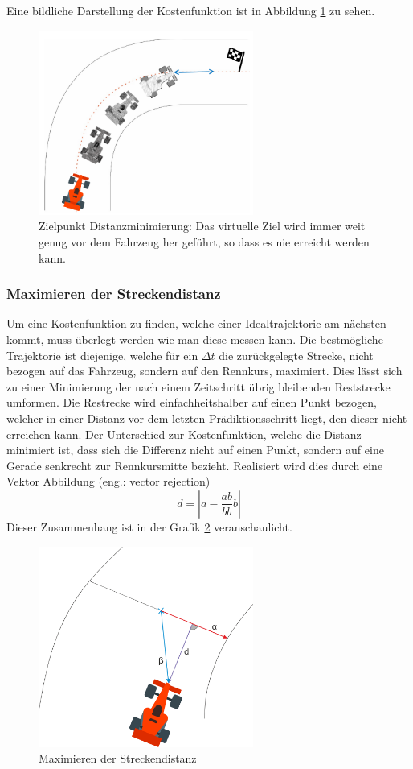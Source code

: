 \documentclass{like}
\begin{document}
Eine bildliche Darstellung der Kostenfunktion ist in Abbildung \ref{fig:costGoalDist} zu sehen. 

\begin{figure}[ht!]
	\centering
	\includegraphics[width=200pt]{Abbildungen/cost_goal_dist.png}
	\caption{Zielpunkt Distanzminimierung: Das virtuelle Ziel wird immer weit genug vor dem Fahrzeug her geführt, so dass es nie erreicht werden kann.}
	\label{fig:costGoalDist}
\end{figure}

\subsubsection*{Maximieren der Streckendistanz}
Um eine Kostenfunktion zu finden, welche einer Idealtrajektorie am nächsten kommt, muss überlegt werden wie man diese messen kann. Die bestmögliche Trajektorie ist diejenige, welche für ein $\Delta t$ die zurückgelegte Strecke, nicht bezogen auf das Fahrzeug, sondern auf den Rennkurs, maximiert. Dies lässt sich zu einer Minimierung der nach einem Zeitschritt übrig bleibenden Reststrecke umformen. Die Restrecke wird einfachheitshalber auf einen Punkt bezogen, welcher in einer Distanz vor dem letzten Prädiktionsschritt liegt, den dieser nicht erreichen kann. Der Unterschied zur Kostenfunktion, welche die Distanz minimiert ist, dass sich die Differenz nicht auf einen Punkt, sondern auf eine Gerade senkrecht zur Rennkursmitte bezieht.
Realisiert wird dies durch eine Vektor Abbildung (eng.: vector rejection)
\begin{equation}
	d = |a - \frac{ab}{bb}b|
\end{equation}
Dieser Zusammenhang ist in der Grafik \ref{fig:maxDist} veranschaulicht.

\begin{figure}[ht!]
	\centering
	\includegraphics[width=200pt]{Abbildungen/vektorRejection.png}
	\caption{Maximieren der Streckendistanz}
	\label{fig:maxDist}
\end{figure}
\end{document}
